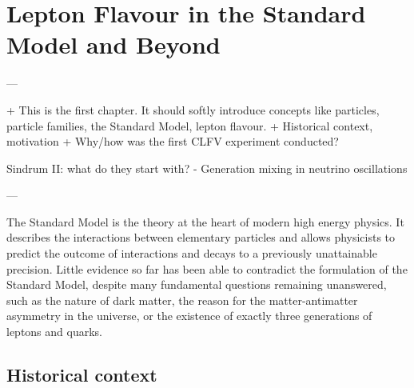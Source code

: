 \chapter{Lepton Flavour in the Standard Model and Beyond}\label{chapter1}

\begin{markdown}
---

+ This is the first chapter. It should softly introduce concepts like particles, particle families, the Standard Model, lepton flavour.
+ Historical context, motivation
 + Why/how was the first CLFV experiment conducted?

Sindrum II: what do they start with?
 - Generation mixing in neutrino oscillations


---
\end{markdown}

The Standard Model is the theory at the heart of modern high energy physics. It describes the interactions between elementary particles and allows physicists to predict the outcome of interactions and decays to a previously unattainable precision. Little evidence so far has been able to contradict the formulation of the Standard Model, despite many fundamental questions remaining unanswered, such as the nature of dark matter, the reason for the matter-antimatter asymmetry in the universe, or the existence of exactly three generations of leptons and quarks.


\section{Historical context}

